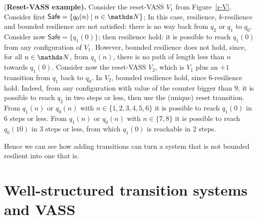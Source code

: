 \documentclass[runningheads]{llncs}
\newcommand{\Safe}{\textsf{Safe}}
\begin{document}
\begin{example}\label{Example}
{(\bf Reset-VASS example).}
Consider the 
 reset-VASS $V_1$ from Figure~\ref{r-V}.
Consider first $\Safe = \{q_0(n) \mid n \in \N\}$; In this case,  {resilience}, 
{$k$-resilience} and {bounded resilience} are not satisfied: there is no  way back from $q_2$ or $q_1$ to $q_0$. Consider now $\Safe = \{q_1(0)\} $; then {resilience} hold: it is possible to reach $q_1(0)$ from any configuration of $V_1$. However, {bounded resilience} does not hold, since, for all $n\in \N$, from $q_1(n)$, there is no path of length less than $n$ towards $q_1(0)$. Consider now the 
 reset-VASS $V_2$, which is $V_1$ plus an $+1$ transition from $q_1$ back to $q_0$. In $V_2$, {bounded resilience} hold, since $6$-resilience hold. 
Indeed, from any configuration with value of the counter bigger than $9$, it is possible to reach $q_2$ in two steps or less, then use the (unique) reset transition. From $q_1(n)$ or $q_0(n)$ with $n \in \{1, 2, 3, 4, 5, 6\}$ it is possible to reach $q_1(0)$ in $6$ steps or less. From 
$q_1(n)$ or $q_0(n)$ with $n \in \{7,8\}$ it is possible to reach $q_0(10)$ in $3$ steps or less, from which $q_1(0)$ is reachable in $2$ steps. 
\end{example}

Hence we can see how adding transitions can 
turn a system that is not bounded resilient into one that is. 





\section{Well-structured transition systems and VASS}\label{section definitions}
\end{document}
